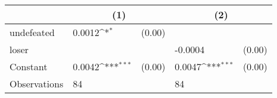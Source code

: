 {
\def\sym#1{\ifmmode^{#1}\else\(^{#1}\)\fi}
\begin{tabular*}{.7\hsize}{@{\hskip\tabcolsep\extracolsep\fill}l*{2}{lc}}
\toprule
                &\multicolumn{2}{c}{(1)}     &\multicolumn{2}{c}{(2)}     \\
\midrule
undefeated      &   0.0012\sym{*}  &   (0.00)&                  &         \\
loser           &                  &         &  -0.0004         &   (0.00)\\
Constant        &   0.0042\sym{***}&   (0.00)&   0.0047\sym{***}&   (0.00)\\
\midrule
Observations    &       84         &         &       84         &         \\
\bottomrule
\end{tabular*}
}
